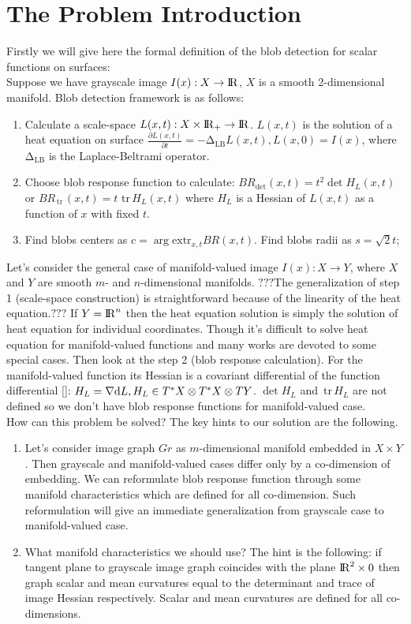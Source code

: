 \documentclass{llncs}
\newcommand{\LaplaceBeltrami}{\mathrm{\Delta_{{LB}}}}
\newcommand{\partderiv}[2]{\frac{\partial #1}{\partial #2}}
\newcommand{\extr}[1]{\mathrm{extr}_{#1}}
\newcommand{\toreal}{\rightarrow\bbbr}
\newcommand{\CovariantDiff}{\nabla}
\newcommand{\Diff}{\mathrm{d}}
\newcommand{\TangentBundle}[1]{T{#1}}
\newcommand{\CotangentBundle}[1]{\tensor*{T}{^{*}}{#1}}
\newcommand {\tr}{{\,}\mathrm{tr}{\,}}
\begin{document}
\section{The Problem Introduction}
Firstly we will give here the formal definition of the blob detection for scalar functions on surfaces: \\
Suppose we have  grayscale image $I(x):X \toreal$, $X$ is a smooth 2-dimensional manifold. Blob detection framework is as follows:
\begin{enumerate} 
\item Calculate a scale-space $L(x,t):X\times \bbbr_{+} \toreal$. $L(x,t)$ is the solution of a heat equation  on surface
  $\partderiv{L(x, t)}{t}=-\LaplaceBeltrami{ L(x, t)},L(x, 0)=I(x)$, where $\LaplaceBeltrami$ is the Laplace-Beltrami operator.
\item Choose blob response function to calculate: $BR_{\det}(x, t)=t^2 \det{H_L(x,t)}$ or $BR_{\tr}(x, t)=t\, \tr {H_L(x,t)}$ where $H_L$ is a Hessian of $L(x, t)$ as a function of $x$ with fixed $t$.
\item Find blobs centers as $c=\arg \extr{x,t} BR(x, t)$. Find blobs radii as $s=\sqrt{2} t$;
\end{enumerate}

Let’s consider the general case of manifold-valued image $I(x):X \to Y$, where $X$ and $Y$ are smooth $m$- and $n$-dimensional manifolds. $???$The generalization of step 1 (scale-space construction) is straightforward because of the linearity of the heat equation.$???$ If $Y={\rm I\!R}^n$ then the heat equation solution is simply the solution of heat equation for individual coordinates. Though it's difficult to solve heat equation for manifold-valued functions and many works are devoted to some special cases. Then look at the step 2 (blob response calculation). For the manifold-valued function its Hessian is a covariant differential of the function differential []: $H_L=\CovariantDiff \Diff L,H_L \in \CotangentBundle{X}\otimes\CotangentBundle{X}\otimes\TangentBundle{Y}$. $\det H_L$ and $\tr{H_L}$ are not defined so we don't have blob response functions for manifold-valued case. 
\\
How can this problem be solved? The key hints to our solution are the following.
\begin{enumerate}
\item	Let's consider image graph $Gr$ as $m$-dimensional manifold embedded in $X\times Y$. Then grayscale and manifold-valued cases differ only by a co-dimension of embedding. We can reformulate blob response function through some manifold characteristics which are defined for all co-dimension. Such reformulation will give an immediate generalization from grayscale case to manifold-valued case. 
\item	What manifold characteristics we should use? The hint is the following: if tangent plane to grayscale image graph coincides with the plane ${\rm I\!R}^2\times 0$ then graph scalar and mean curvatures equal to the determinant and trace of image Hessian respectively. Scalar and mean curvatures are defined for all co-dimensions.
\end{enumerate}
\end{document}
